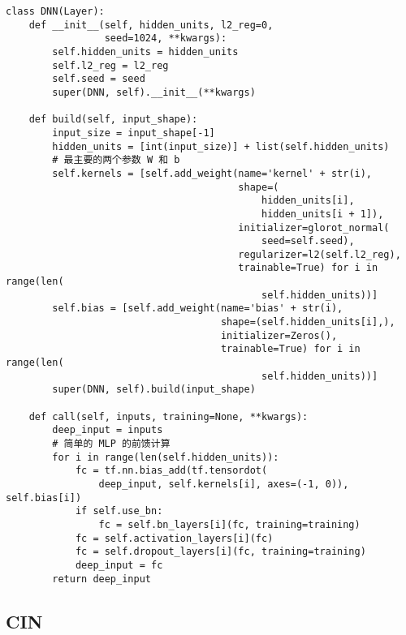 \documentclass[degree=master,cjk-font=noto]{thuthesis}
\begin{document}
  \begin{verbatim}
class DNN(Layer):
    def __init__(self, hidden_units, l2_reg=0,
                 seed=1024, **kwargs):
        self.hidden_units = hidden_units
        self.l2_reg = l2_reg
        self.seed = seed
        super(DNN, self).__init__(**kwargs)

    def build(self, input_shape):
        input_size = input_shape[-1]
        hidden_units = [int(input_size)] + list(self.hidden_units)
        # 最主要的两个参数 W 和 b
        self.kernels = [self.add_weight(name='kernel' + str(i),
                                        shape=(
                                            hidden_units[i],
                                            hidden_units[i + 1]),
                                        initializer=glorot_normal(
                                            seed=self.seed),
                                        regularizer=l2(self.l2_reg),
                                        trainable=True) for i in range(len(
                                            self.hidden_units))]
        self.bias = [self.add_weight(name='bias' + str(i),
                                     shape=(self.hidden_units[i],),
                                     initializer=Zeros(),
                                     trainable=True) for i in range(len(
                                            self.hidden_units))]
        super(DNN, self).build(input_shape)

    def call(self, inputs, training=None, **kwargs):
        deep_input = inputs
        # 简单的 MLP 的前馈计算
        for i in range(len(self.hidden_units)):
            fc = tf.nn.bias_add(tf.tensordot(
                deep_input, self.kernels[i], axes=(-1, 0)), self.bias[i])
            if self.use_bn:
                fc = self.bn_layers[i](fc, training=training)
            fc = self.activation_layers[i](fc)
            fc = self.dropout_layers[i](fc, training=training)
            deep_input = fc
        return deep_input
  \end{verbatim}

\subsection{CIN}
\end{document}
